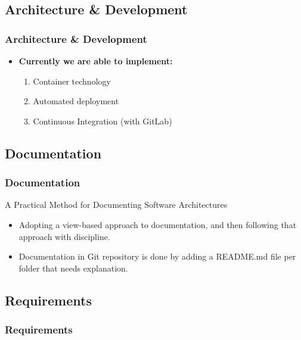 \documentclass[12pt]{beamer}
\begin{document}
    \subsection{Architecture \& Development}
    \begin{frame}
        \frametitle{Architecture \& Development}
        \begin{itemize}
            \item<1->\textbf{Currently we are able to implement:}
            \begin{enumerate}    
                \item<2-> Container technology
                \item<3-> Automated deployment
                \item<4-> Continuous Integration (with GitLab)
            \end{enumerate}
        \end{itemize}
    \end{frame}

    \subsection{Documentation}
    \begin{frame}
        \frametitle{Documentation}
        A Practical Method for Documenting Software Architectures
    \begin{itemize}
        \item Adopting a view-based approach to documentation,
        and then following that approach with discipline.
        \item Documentation in Git repository is done by adding a README.md file
        per folder that needs explanation.
    \end{itemize}
    \end{frame}

    \subsection{Requirements}
    \begin{frame}
        \frametitle{Requirements}
    \end{frame}
\end{document}
